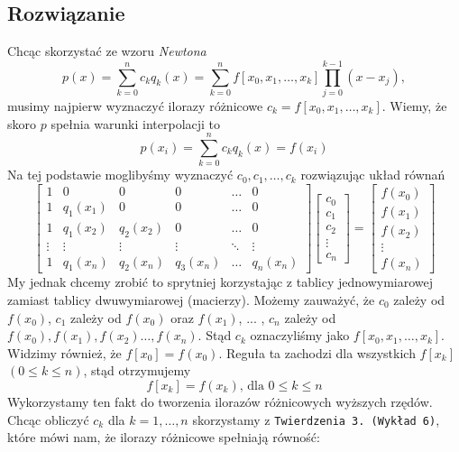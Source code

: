 \documentclass[a4paper]{article}
\begin{document}
    \subsection{Rozwiązanie}
    Chcąc skorzystać ze wzoru \emph{Newtona}
   \[ p(x) = \sum_{k=0}^n c_kq_k(x) = \sum_{k=0}^n f[x_0,x_1,\dots,x_k] \prod_{j=0}^{k-1} (x - x_j),\]
    musimy najpierw wyznaczyć ilorazy różnicowe $c_k = f[x_0,x_1,\dots,x_k]$.
    Wiemy, że skoro $p$ spełnia warunki interpolacji to 
    \[p(x_i) = \sum_{k=0}^n c_kq_k(x) = f(x_i)\]
    Na tej podstawie moglibyśmy wyznaczyć $c_0, c_1, \dots, c_k$ rozwiązując układ równań
    \[
    \begin{bmatrix}
    1       & 0           & 0         & 0       & \dots     & 0         \\
    1       & q_1(x_1)    & 0         & 0       & \dots     & 0         \\
    1       & q_1(x_2)    & q_2(x_2)  & 0       & \dots     & 0         \\
    \vdots  & \vdots      & \vdots    & \vdots  & \ddots    & \vdots    \\
    1       & q_1(x_n)    & q_2(x_n)  & q_3(x_n)& \dots     & q_n(x_n)  
    \end{bmatrix}
    \begin{bmatrix}
    c_0 \\
    c_1 \\
    c_2 \\
    \vdots \\
    c_n
    \end{bmatrix}
    =
    \begin{bmatrix}
    f(x_0) \\
    f(x_1) \\
    f(x_2) \\
    \vdots \\
    f(x_n)
    \end{bmatrix}
    \]
    My jednak chcemy zrobić to sprytniej korzystając z tablicy jednowymiarowej zamiast tablicy dwuwymiarowej (macierzy).
    Możemy zauważyć, że $c_0$ zależy od $f(x_0)$, $c_1$ zależy od $f(x_0)$ oraz $f(x_1)$, ... , $c_n$ zależy od $f(x_0), f(x_1),f(x_2) \dots, f(x_n)$. Stąd $c_k$ oznaczyliśmy jako $f[x_0,x_1,\dots,x_k]$.
    Widzimy również, że $f[x_0] = f(x_0)$. Reguła ta zachodzi dla wszystkich $f[x_k]$ $(0 \leq k \leq n)$, stąd otrzymujemy
    \[f[x_k] = f(x_k) \text{, dla } 0 \leq k \leq n \]
    Wykorzystamy ten fakt do tworzenia ilorazów różnicowych wyższych rzędów. Chcąc obliczyć $c_k$ dla $ k = 1,\dots, n$ skorzystamy z \texttt{Twierdzenia 3. (Wykład 6)}, które mówi nam, że ilorazy różnicowe spełniają równość:
\end{document}
